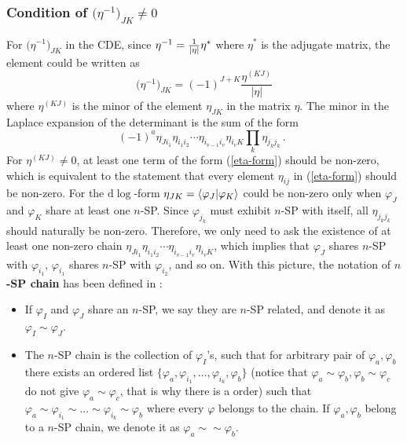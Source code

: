 \documentclass[a4paper,11pt]{article}
\newcommand{\nd}{\mathrm{d}}
\def\eref#1{(\ref{#1})}
\begin{document}
\subsubsection{Condition of $\big( \eta^{-1} \big)_{JK}\neq 0$}
For $\big( \eta^{-1} \big)_{JK}$  in the CDE, since $\eta^{-1}={1\over |\eta|}\eta^*$ where $\eta^*$ is the adjugate matrix, the element could be written as 
\begin{equation}
\big( \eta^{-1} \big)_{JK} = (-1)^{J+K} \frac{\eta^{(KJ)}}{|\eta|}
\end{equation}
where $\eta^{(KJ)}$ is the minor of the element $\eta_{JK}$ in the matrix  $\eta$. The minor in the Laplace expansion of the determinant is the sum of the form
%
\begin{equation}
	(-1)^a \eta_{J i_1}\eta_{i_1 i_2}\cdots \eta_{i_{v-1} i_v}\eta_{i_v K} \prod_{k}\eta_{j_k j_k} \, .~~\label{eta-form}
\end{equation}
%
For $\eta^{(KJ)}\neq 0$, at least one term of the form \eref{eta-form} should be non-zero, which 
is equivalent to the statement that every element $\eta_{ij}$ in \eref{eta-form} should be non-zero. For the $\nd \log$-form
$\eta_{JK} = \braket{\varphi_J|\varphi_K}$ could be non-zero only when  $\varphi_J$ and  $\varphi_K$ share at least one $n$-SP. Since 
 $\varphi_{j_k}$ must exhibit $n$-SP with itself, all $\eta_{j_k j_k}$ should naturally be non-zero. Therefore, we only need to ask  the existence of at least one non-zero chain $\eta_{J i_1}\eta_{i_1 i_2}\cdots \eta_{i_{v-1} i_v}\eta_{i_v K}$, which implies that $\varphi_J$ shares $n$-SP with $\varphi_{i_1}$, $\varphi_{i_1}$ shares $n$-SP with $\varphi_{i_2}$, and so on. With this picture, the notation of 
{\bf  $n$-SP chain} has been defined  in \cite{Chen:2023kgw}: 
\begin{itemize}
\item If $\varphi_I$ and $\varphi_J$ share an $n$-SP, we say they are $n$-SP related, and denote it as $\varphi_I \sim \varphi_J$. 
\item The $n$-SP chain is the collection of $\varphi_I$'s, such that for arbitrary pair of $\varphi_a, \varphi_b$
there exists an ordered list $\{\varphi_a, \varphi_{i_1},...,\varphi_{i_k}, \varphi_b \}$ (notice that $\varphi_a\sim \varphi_b, \varphi_b \sim \varphi_c$ do not give $\varphi_a \sim \varphi_c$, that is why there is a order) such that
$\varphi_a\sim \varphi_{i_1}\sim ...\sim \varphi_{i_k}\sim\varphi_b $ where every $\varphi$ belongs to the chain.  If $\varphi_a, \varphi_b$ belong to a $n$-SP chain, we denote it as $\varphi_a\sim\sim\varphi_b$. 

\end{itemize}
\end{document}
